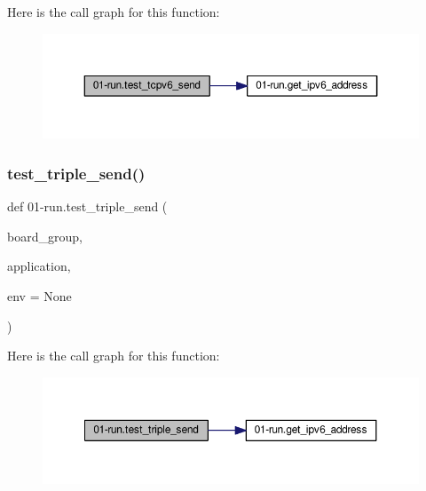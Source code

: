 Here is the call graph for this function\+:
\nopagebreak
\begin{figure}[H]
\begin{center}
\leavevmode
\includegraphics[width=350pt]{namespace01-run_aa33fb8b27f2a329f22f50abe430854eb_cgraph}
\end{center}
\end{figure}
\mbox{\label{namespace01-run_ae96b1a02460277a9a00628064721b4ae}} 
\subsubsection{\texorpdfstring{test\+\_\+triple\+\_\+send()}{test\_triple\_send()}}
{\footnotesize\ttfamily def 01-\/run.\+test\+\_\+triple\+\_\+send (\begin{DoxyParamCaption}\item[{}]{board\+\_\+group,  }\item[{}]{application,  }\item[{}]{env = {\ttfamily None} }\end{DoxyParamCaption})}

Here is the call graph for this function\+:
\nopagebreak
\begin{figure}[H]
\begin{center}
\leavevmode
\includegraphics[width=350pt]{namespace01-run_ae96b1a02460277a9a00628064721b4ae_cgraph}
\end{center}
\end{figure}
\mbox{\label{namespace01-run_a498ff87ebeb18334cf6110214d60bb53}} 
